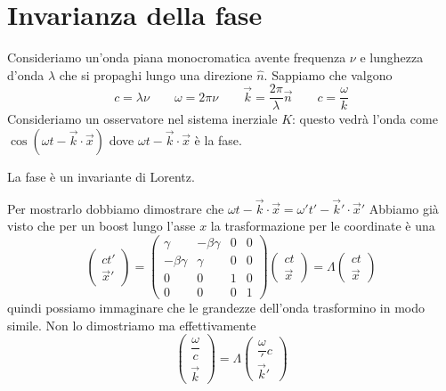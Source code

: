 \documentclass[12pt,a4paper,titlepage, twoside, openright]{book}
\newenvironment{proof:}[1][\proofname]{  %
 \begin{tcolorbox}[
	breakable, 
	enhanced, 
	interior hidden, 
	frame hidden, 
	borderline west = {1pt}{0pt}{gray}, 
	top=0pt, bottom=0pt, left=0pt]
\begin{proof}[#1:]~
}
{
\end{proof}
\end{tcolorbox}
}
\numberwithin{equation}{chapter}
\begin{document}
\section{Invarianza della fase}
Consideriamo un'onda piana monocromatica avente frequenza $\nu$ e lunghezza d'onda $\lambda$ che si propaghi lungo una direzione $\hat{n}$. Sappiamo che valgono
\[
c=\lambda\nu \qquad \omega=2\pi\nu \qquad  \vec{k}=\dfrac{2\pi}{\lambda}\vec{n} \qquad c=\dfrac{\omega}{k}
\]
Consideriamo un osservatore nel sistema inerziale $K$: questo vedrà l'onda come $\cos{(\omega t -\vec{k}\cdot\vec{x})}$ dove $\omega t -\vec{k}\cdot\vec{x}$ è la fase.


La fase è un invariante di Lorentz.


\begin{proof:}
Per mostrarlo dobbiamo dimostrare che $\omega t -\vec{k}\cdot\vec{x}=\omega' t' -\vec{k}'\cdot\vec{x}'$
Abbiamo già visto che per un boost lungo l'asse $x$ la trasformazione per le coordinate è una
\[
\left(\begin{array}{c}
ct' \\ \vec{x}' \end{array}\right)=\left(\begin{array}{cccc}
\gamma & -\beta\gamma & 0 &0 \\ -\beta\gamma & \gamma & 0 & 0 \\ 0 & 0 & 1 & 0 \\ 0 & 0 & 0 & 1\end{array}\right)\left(\begin{array}{c}
ct \\ \vec{x}
\end{array}\right) = \Lambda \left(\begin{array}{c}
ct \\ \vec{x}
\end{array}\right) 
\]
quindi possiamo immaginare che le grandezze dell'onda trasformino in modo simile. Non lo dimostriamo ma effettivamente \begin{equation}\label{eqTrasfFase}
\left(\begin{array}{c}
\dfrac{\omega}{c} \\ \vec{k} \end{array}\right) = \Lambda \left(\begin{array}{c}
\dfrac{\omega}'{c} \\ \vec{k}'
\end{array}\right)
\end{equation}


\end{proof:}
\end{document}
